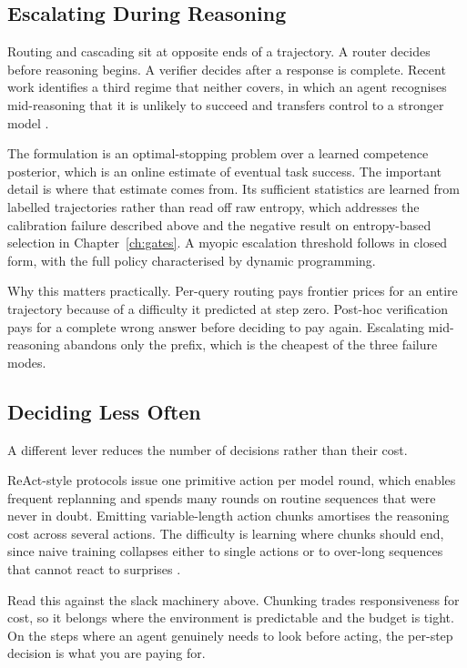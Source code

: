 \subsection{Escalating During Reasoning}

Routing and cascading sit at opposite ends of a trajectory. A router decides
before reasoning begins. A verifier decides after a response is complete. Recent
work identifies a third regime that neither covers, in which an agent recognises
mid-reasoning that it is unlikely to succeed and transfers control to a stronger
model \cite{selfescalate2026}.

The formulation is an optimal-stopping problem over a learned competence
posterior, which is an online estimate of eventual task success. The important
detail is where that estimate comes from. Its sufficient statistics are learned
from labelled trajectories rather than read off raw entropy, which addresses the
calibration failure described above and the negative result on entropy-based
selection in Chapter~\ref{ch:gates}. A myopic escalation threshold follows in
closed form, with the full policy characterised by dynamic programming.

Why this matters practically. Per-query routing pays frontier prices for an
entire trajectory because of a difficulty it predicted at step zero. Post-hoc
verification pays for a complete wrong answer before deciding to pay again.
Escalating mid-reasoning abandons only the prefix, which is the cheapest of the
three failure modes.

\subsection{Deciding Less Often}

A different lever reduces the number of decisions rather than their cost.

ReAct-style protocols issue one primitive action per model round, which enables
frequent replanning and spends many rounds on routine sequences that were never
in doubt. Emitting variable-length action chunks amortises the reasoning cost
across several actions. The difficulty is learning where chunks should end,
since naive training collapses either to single actions or to over-long
sequences that cannot react to surprises \cite{chunking2026}.

Read this against the slack machinery above. Chunking trades responsiveness for
cost, so it belongs where the environment is predictable and the budget is
tight. On the steps where an agent genuinely needs to look before acting, the
per-step decision is what you are paying for.

